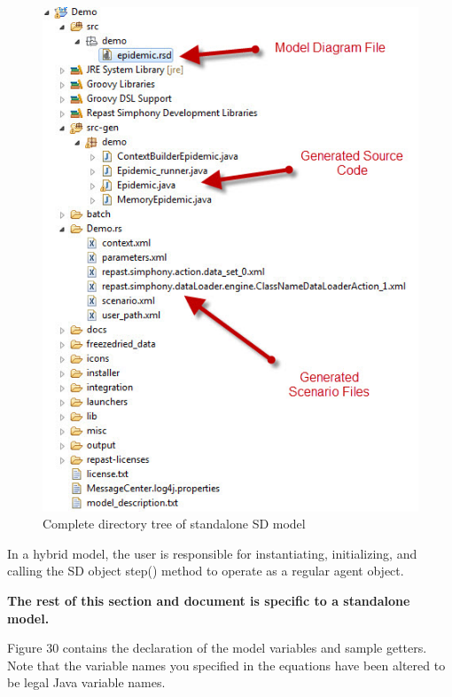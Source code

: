 \documentclass[11pt]{amsart}
\begin{document}
\begin{figure}[ht]
\begin{center}
\vspace{.2in}
\centerline {
\includegraphics[totalheight=0.45\textheight]{images/027.jpg}
}
\caption{Complete directory tree of standalone SD model}
\label{fig:027}
\end{center}
\end{figure}

In a hybrid model, the user is responsible for instantiating, initializing, and calling the SD object step() method to operate as a regular agent object.

\textbf{The rest of this section and document is specific to a standalone model.}

Figure 30 contains the declaration of the model variables and sample getters. Note that the variable names you specified in the equations have been altered to be legal Java variable names.
\end{document}
